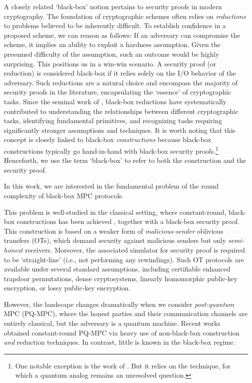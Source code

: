  A closely related `black-box' notion pertains to security proofs in modern cryptography. The foundation of cryptographic schemes often relies on {\em reductions} to problems believed to be inherently difficult. To establish confidence in a proposed scheme, we can reason as follows: If an adversary can compromise the scheme, it implies an ability to exploit a hardness assumption. Given the presumed difficulty of the assumption, such an outcome would be highly surprising. This positions us in a win-win scenario. A security proof (or reduction) is considered black-box if it relies solely on the I/O behavior of the adversary. Such reductions are a natural choice and encompass the majority of security proofs in the literature, encapsulating the `essence' of cryptographic tasks. Since the seminal work of \cite{STOC:ImpRud89}, black-box reductions have systematically contributed to understanding the relationships between different cryptographic tasks, identifying fundamental primitives, and recognizing tasks requiring significantly stronger assumptions and techniques. It is worth noting that this concept is closely linked to black-box {\em constructions} because black-box constructions typically go hand-in-hand with black-box security proofs.\footnote{One notable exception is the work of \cite{STOC:GOSV14}. But it relies on the \cite{FOCS:Barak01} technique, for which a quantum analog remains an unresolved question.} Henceforth, we use the term `black-box' to refer to both the construction and the security proof. 


In this work, we are interested in the fundamental problem of the round complexity of black-box MPC protocols.

 This problem is well-studied in the classical setting, where constant-round, black-box constructions has been achieved \cite{STOC:Goyal11}, together with a black-box security proof. This construction is based on a weaker form of {\em malicious-sender} oblivious transfers (OTs), which demand security against malicious senders but only {\em semi-honest} receivers. Moreover, the associated simulator for security proof is required to be `straight-line' (i.e., not performing any rewindings). Such OT protocols are available under several standard assumptions, including certifiable enhanced trapdoor permutations, dense cryptosystems, linearly homomorphic public-key encryption, or lossy public-key encryption.

However, the landscape changes dramatically when we consider {\em post-quantum} MPC (PQ-MPC), where the honest parties and their communication channels are entirely classical, but the adversary is a quantum machine. Recent works \cite{EC:ABGKM21,FOCS:LPY23} obtained constant-round PQ-MPC via heavy use of non-black-box construction {\em and} reduction techniques. In contrast, little is known in the black-box regime. 

